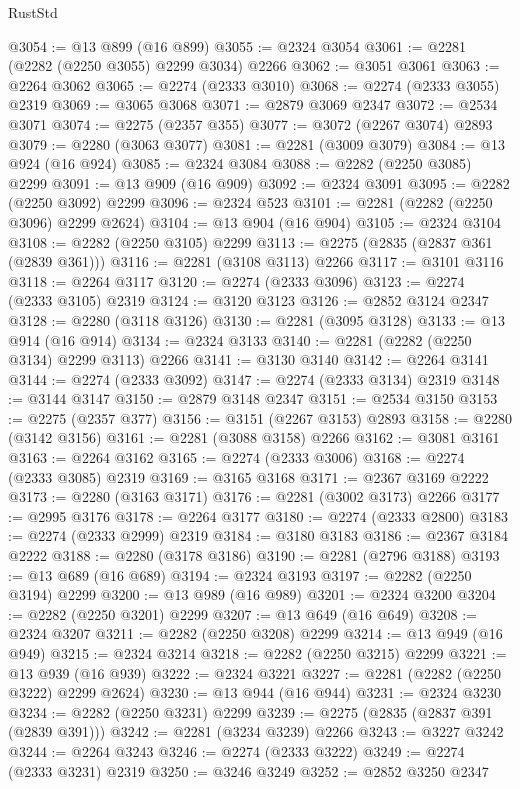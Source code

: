 \begin{lexlean}{RustStd}
\begin{coremodule}
@3054 := @13 @899 (@16 @899)
@3055 := @2324 @3054
@3061 := @2281 (@2282 (@2250 @3055) @2299 @3034) @2266
@3062 := @3051 @3061
@3063 := @2264 @3062
@3065 := @2274 (@2333 @3010)
@3068 := @2274 (@2333 @3055) @2319
@3069 := @3065 @3068
@3071 := @2879 @3069 @2347
@3072 := @2534 @3071
@3074 := @2275 (@2357 @355)
@3077 := @3072 (@2267 @3074) @2893
@3079 := @2280 (@3063 @3077)
@3081 := @2281 (@3009 @3079)
@3084 := @13 @924 (@16 @924)
@3085 := @2324 @3084
@3088 := @2282 (@2250 @3085) @2299
@3091 := @13 @909 (@16 @909)
@3092 := @2324 @3091
@3095 := @2282 (@2250 @3092) @2299
@3096 := @2324 @523
@3101 := @2281 (@2282 (@2250 @3096) @2299 @2624)
@3104 := @13 @904 (@16 @904)
@3105 := @2324 @3104
@3108 := @2282 (@2250 @3105) @2299
@3113 := @2275 (@2835 (@2837 @361 (@2839 @361)))
@3116 := @2281 (@3108 @3113) @2266
@3117 := @3101 @3116
@3118 := @2264 @3117
@3120 := @2274 (@2333 @3096)
@3123 := @2274 (@2333 @3105) @2319
@3124 := @3120 @3123
@3126 := @2852 @3124 @2347
@3128 := @2280 (@3118 @3126)
@3130 := @2281 (@3095 @3128)
@3133 := @13 @914 (@16 @914)
@3134 := @2324 @3133
@3140 := @2281 (@2282 (@2250 @3134) @2299 @3113) @2266
@3141 := @3130 @3140
@3142 := @2264 @3141
@3144 := @2274 (@2333 @3092)
@3147 := @2274 (@2333 @3134) @2319
@3148 := @3144 @3147
@3150 := @2879 @3148 @2347
@3151 := @2534 @3150
@3153 := @2275 (@2357 @377)
@3156 := @3151 (@2267 @3153) @2893
@3158 := @2280 (@3142 @3156)
@3161 := @2281 (@3088 @3158) @2266
@3162 := @3081 @3161
@3163 := @2264 @3162
@3165 := @2274 (@2333 @3006)
@3168 := @2274 (@2333 @3085) @2319
@3169 := @3165 @3168
@3171 := @2367 @3169 @2222
@3173 := @2280 (@3163 @3171)
@3176 := @2281 (@3002 @3173) @2266
@3177 := @2995 @3176
@3178 := @2264 @3177
@3180 := @2274 (@2333 @2800)
@3183 := @2274 (@2333 @2999) @2319
@3184 := @3180 @3183
@3186 := @2367 @3184 @2222
@3188 := @2280 (@3178 @3186)
@3190 := @2281 (@2796 @3188)
@3193 := @13 @689 (@16 @689)
@3194 := @2324 @3193
@3197 := @2282 (@2250 @3194) @2299
@3200 := @13 @989 (@16 @989)
@3201 := @2324 @3200
@3204 := @2282 (@2250 @3201) @2299
@3207 := @13 @649 (@16 @649)
@3208 := @2324 @3207
@3211 := @2282 (@2250 @3208) @2299
@3214 := @13 @949 (@16 @949)
@3215 := @2324 @3214
@3218 := @2282 (@2250 @3215) @2299
@3221 := @13 @939 (@16 @939)
@3222 := @2324 @3221
@3227 := @2281 (@2282 (@2250 @3222) @2299 @2624)
@3230 := @13 @944 (@16 @944)
@3231 := @2324 @3230
@3234 := @2282 (@2250 @3231) @2299
@3239 := @2275 (@2835 (@2837 @391 (@2839 @391)))
@3242 := @2281 (@3234 @3239) @2266
@3243 := @3227 @3242
@3244 := @2264 @3243
@3246 := @2274 (@2333 @3222)
@3249 := @2274 (@2333 @3231) @2319
@3250 := @3246 @3249
@3252 := @2852 @3250 @2347

\end{coremodule}
\end{lexlean}
